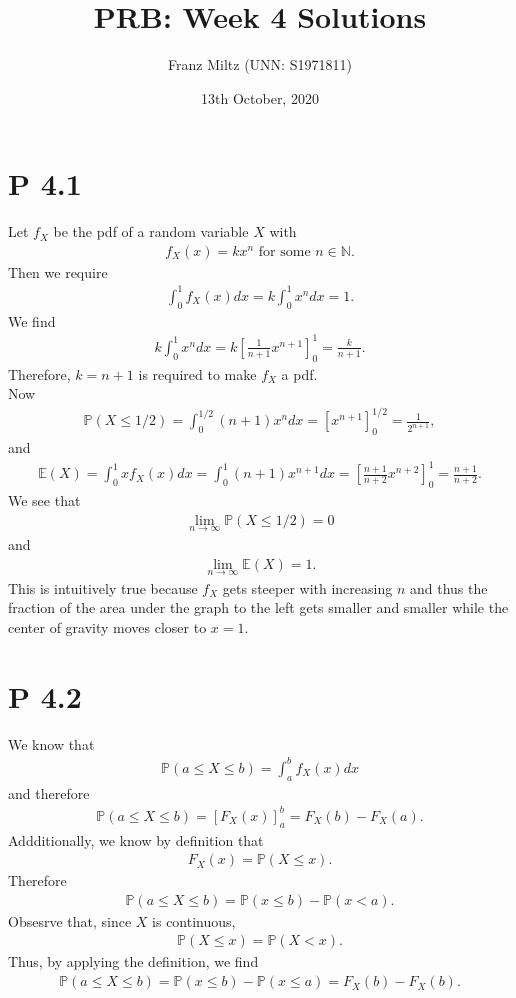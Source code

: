 \documentclass{article}
\newcommand{\N}{\mathbb{N}}
\renewcommand{\P}{\mathbb{P}}
\newcommand{\E}{\mathbb{E}}
\begin{document}
\title{PRB: Week 4 Solutions}
\author{Franz Miltz (UNN: S1971811)}
\date{13th October, 2020}
\maketitle
\section*{P 4.1} 
Let $f_X$ be the pdf of a random variable $X$ with
\begin{align*}
  f_X(x) = k x^n \text{ for some } n\in\N.
\end{align*}
Then we require
\begin{align*}
  \int_0^1 f_X(x) dx = k\int_0^1 x^n dx = 1.
\end{align*}
We find
\begin{align*}
   k\int_0^1 x^n dx = k\left[\frac{1}{n+1}x^{n+1}\right]_0^1 = \frac{k}{n+1}.
\end{align*}
Therefore, $k=n+1$ is required to make $f_X$ a pdf.\\
Now 
\begin{align*}
  \P(X\leq 1/2) = \int_0^{1/2} (n+1)x^n dx = \left[x^{n+1}\right]_0^{1/2} 
  =\frac{1}{2^{n+1}},
\end{align*}
and
\begin{align*}
  \E(X) = \int_0^1 x f_X(x) dx = \int_0^1 (n+1)x^{n+1} dx
  = \left[\frac{n+1}{n+2}x^{n+2}\right]_0^1 = \frac{n+1}{n+2}.
\end{align*}
We see that 
\begin{align*}
  \lim_{n\to\infty} \P(X\leq 1/2) = 0
\end{align*}
and
\begin{align*}
  \lim_{n\to\infty} \E(X) = 1.
\end{align*}
This is intuitively true because $f_X$ gets steeper with increasing
$n$ and thus the fraction of the area under the graph to the left 
gets smaller and smaller while the center of gravity moves closer to
$x=1$.
\section*{P 4.2}
We know that
\begin{align*}
  \P(a \leq X \leq b) = \int_a^b f_X(x) dx 
\end{align*}
and therefore
\begin{align*}
  \P(a \leq X \leq b) = \left[F_X(x)\right]_a^b = F_X(b) - F_X(a).
\end{align*}
Addditionally, we know by definition that
\begin{align*}
  F_X(x) = \P(X \leq x).
\end{align*}
Therefore
\begin{align*}
  \P(a \leq X \leq b) = \P(x \leq b) - \P(x < a).
\end{align*}
Obsesrve that, since $X$ is continuous,
\begin{align*}
  \P(X \leq x) = \P(X < x). 
\end{align*}
Thus, by applying the definition, we find
\begin{align*}
  \P(a \leq X \leq b) = \P(x \leq b) - \P(x \leq a) = F_X(b) - F_X(b).
\end{align*}
\end{document}
